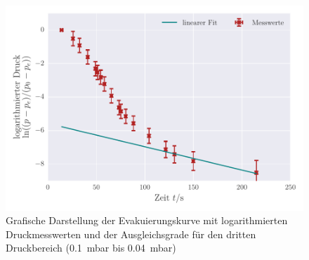 \begin{figure}[!h]
 \centering
 \includegraphics[scale=.90]{../Grafiken/Evakuierungskurve_Drehschieber_log_2.pdf}
 \caption{Grafische Darstellung der Evakuierungskurve mit logarithmierten Druckmesswerten und der Ausgleichsgrade für den dritten Druckbereich (\SI{0.1}{\milli\bar} bis \SI{0.04}{\milli\bar}) \label{fig:evakuierungskurve_drehschieber_log_2}}
 \end{figure} 